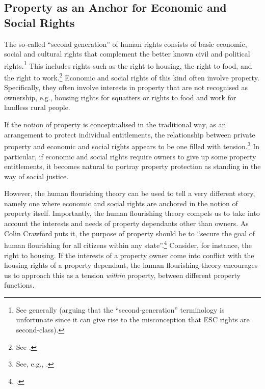 \subsection{Property as an Anchor for Economic and Social Rights}\label{sec:2:5:1}

The so-called ``second generation'' of human rights consists of basic economic, social and cultural  rights that complement the better known civil and political rights.\footnote{See generally \cite[1-14]{baderin07} (arguing that the ``second-generation'' terminology is unfortunate since it can give rise to the misconception that ESC rights are second-class).} This includes rights such as the right to housing, the right to food, and the right to work.\footnote{See \cite[6|7|11]{fnp}.} Economic and social rights of this kind often involve property. Specifically, they often involve interests in property that are not recognised as ownership, e.g., housing rights for squatters or rights to food and work for landless rural people.

If the notion of property is conceptualised in the traditional way, as an arrangement to protect individual entitlements, the relationship between private property and economic and social rights appears to be one filled with tension.\footnote{See, e.g., \cite[138]{garcia14}.} In particular, if economic and social rights require owners to give up some property entitlements, it becomes natural to portray property protection as standing in the way of social justice.

However, the human flourishing theory can be used to tell a very different story, namely one where economic and social rights are anchored in the notion of property itself. Importantly, the human flourishing theory compels us to take into account the interests and needs of property dependants other than owners. As Colin Crawford puts it, the purpose of property should be to ``secure the goal of human flourishing for all citizens within any state''.\footcite[1089]{crawford11} Consider, for instance, the right to housing. If the interests of a property owner come into conflict with the housing rights of a property dependant, the human flourishing theory encourages us to approach this as a tension {\it within} property, between different property functions.

